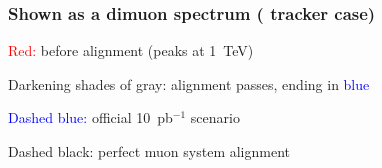 \documentclass[compress]{beamer}
\begin{document}
\begin{frame}
\frametitle{Shown as a dimuon spectrum ( tracker case)}
\begin{center}
\end{center}

\vfill \textcolor{red}{Red:} before alignment (peaks at 1~TeV)

\textcolor{greyone}{Darkening} \textcolor{greytwo}{shades} \textcolor{greythree}{of} \textcolor{greyfour}{gray:} alignment passes, ending in \textcolor{blue}{blue}

\textcolor{blue}{Dashed blue:} official 10~pb$^{-1}$ scenario

Dashed black: perfect muon system alignment
\end{frame}
\end{document}
